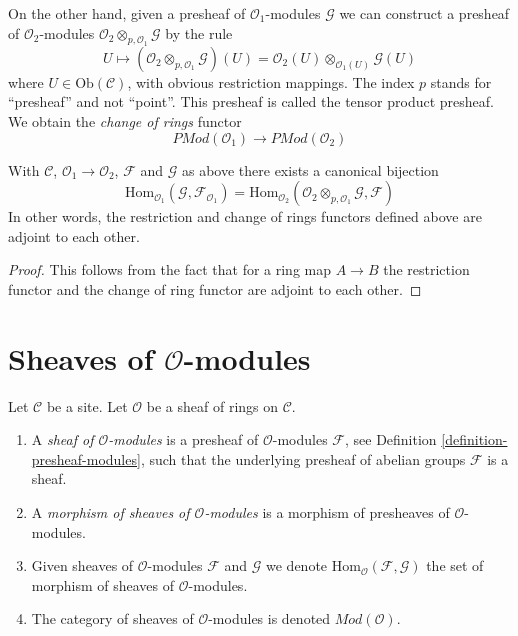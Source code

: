 \medskip\noindent
On the other hand, given a presheaf of $\mathcal{O}_1$-modules
$\mathcal{G}$
we can construct a presheaf of $\mathcal{O}_2$-modules
$\mathcal{O}_2 \otimes_{p, \mathcal{O}_1} \mathcal{G}$
by the rule
$$
U \longmapsto
\left(\mathcal{O}_2 \otimes_{p, \mathcal{O}_1} \mathcal{G}\right)(U)
=
\mathcal{O}_2(U) \otimes_{\mathcal{O}_1(U)} \mathcal{G}(U)
$$
where $U \in \text{Ob}(\mathcal{C})$, with obvious restriction mappings.
The index $p$ stands for ``presheaf'' and not ``point''.
This presheaf is called the tensor product presheaf. We obtain
the {\it change of rings} functor
$$
\textit{PMod}(\mathcal{O}_1)
\longrightarrow
\textit{PMod}(\mathcal{O}_2)
$$

\begin{lemma}
\label{lemma-adjointness-tensor-restrict-presheaves}
With $\mathcal{C}$, $\mathcal{O}_1 \to \mathcal{O}_2$, $\mathcal{F}$ and
$\mathcal{G}$ as above there exists a canonical bijection
$$
\text{Hom}_{\mathcal{O}_1}(\mathcal{G}, \mathcal{F}_{\mathcal{O}_1})
=
\text{Hom}_{\mathcal{O}_2}(
\mathcal{O}_2 \otimes_{p, \mathcal{O}_1} \mathcal{G},
\mathcal{F}
)
$$
In other words, the restriction and change of rings functors defined
above are adjoint to each other.
\end{lemma}

\begin{proof}
This follows from the fact that for a ring map
$A \to B$ the restriction functor and the change
of ring functor are adjoint to each other.
\end{proof}


\section{Sheaves of $\mathcal{O}$-modules}
\label{section-sheaves-modules}

\begin{definition}
\label{definition-sheaf-modules}
Let $\mathcal{C}$ be a site.
Let $\mathcal{O}$ be a sheaf of rings on $\mathcal{C}$.
\begin{enumerate}
\item A {\it sheaf of $\mathcal{O}$-modules} is a presheaf
of $\mathcal{O}$-modules $\mathcal{F}$,
see Definition \ref{definition-presheaf-modules},
such that the underlying presheaf of abelian groups $\mathcal{F}$
is a sheaf.
\item A {\it morphism of sheaves of $\mathcal{O}$-modules}
is a morphism of presheaves of $\mathcal{O}$-modules.
\item Given sheaves of $\mathcal{O}$-modules
$\mathcal{F}$ and $\mathcal{G}$ we denote
$\text{Hom}_{\mathcal{O}}(\mathcal{F}, \mathcal{G})$
the set of morphism of sheaves of $\mathcal{O}$-modules.
\item The category of sheaves of $\mathcal{O}$-modules
is denoted $\textit{Mod}(\mathcal{O})$.
\end{enumerate}
\end{definition}


